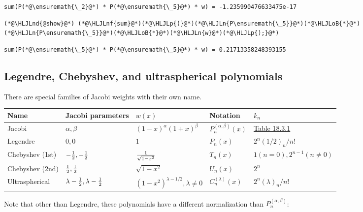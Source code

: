 \documentclass[12pt,a4paper]{article}
\newcommand{\HLJLn}[1]{#1}
\newcommand{\HLJLnd}[1]{\textcolor[RGB]{214,102,97}{#1}}
\newcommand{\HLJLnf}[1]{\textcolor[RGB]{66,102,213}{#1}}
\newcommand{\HLJLoB}[1]{\textcolor[RGB]{102,102,102}{\textbf{#1}}}
\newcommand{\HLJLp}[1]{#1}
\begin{document}
\begin{lstlisting}
sum(P(*@\ensuremath{\_2}@*) * P(*@\ensuremath{\_5}@*) * w) = -1.235990476633475e-17
\end{lstlisting}


\begin{lstlisting}
(*@\HLJLnd{@show}@*) (*@\HLJLnf{sum}@*)(*@\HLJLp{(}@*)(*@\HLJLn{P\ensuremath{\_5}}@*)(*@\HLJLoB{*}@*)(*@\HLJLn{P\ensuremath{\_5}}@*)(*@\HLJLoB{*}@*)(*@\HLJLn{w}@*)(*@\HLJLp{);}@*)
\end{lstlisting}

\begin{lstlisting}
sum(P(*@\ensuremath{\_5}@*) * P(*@\ensuremath{\_5}@*) * w) = 0.21713358248393155
\end{lstlisting}


\subsection{Legendre, Chebyshev, and ultraspherical polynomials}
There are special families of Jacobi weights with their own name. 

\begin{tabular}
{l | l | l | l | l}
Name & Jacobi parameters & $w(x)$ & Notation & $k_n$ \\
\hline
Jacobi & $\alpha,\beta$ & $(1-x)^{\alpha} (1+x)^\beta$ & $P_n^{(\alpha,\beta)}(x)$ & \href{http://dlmf.nist.gov/18.3}{Table 18.3.1} \\
Legendre & $0,0$ & $1$ & $P_n(x)$ & $2^n(1/2)_n/n!$ \\
Chebyshev (1st) & $-{1 \over 2},-{1 \over 2}$ & $1 \over \sqrt{1-x^2}$ & $T_n(x)$ & $1 (n=0), 2^{n-1} (n \neq 0)$ \\
Chebyshev (2nd) & ${1 \over 2},{1 \over 2}$ & $\sqrt{1-x^2}$ & $U_n(x)$ & $2^n$ \\
Ultraspherical & $\lambda-{1 \over 2},\lambda-{1 \over 2}$ & $(1-x^2)^{\lambda - 1/2}, \lambda \neq 0$ & $C_n^{(\lambda)}(x)$ & $2^n(\lambda)_n/n!$ \\
\end{tabular}
Note that other than Legendre, these polynomials have a different normalization than $P_n^{(\alpha,\beta)}$:
\end{document}
